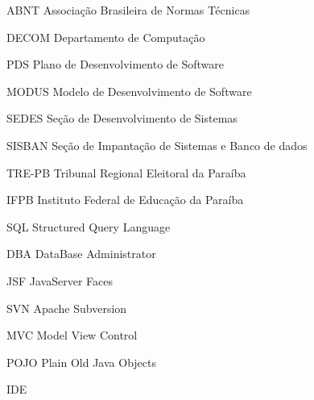 
\begin{siglas}
    \item[ABNT] Associação Brasileira de Normas Técnicas
    \item[DECOM] Departamento de Computação
    \item[PDS] Plano de Desenvolvimento de Software
    \item[MODUS] Modelo de Desenvolvimento de Software
    \item[SEDES] Seção de Desenvolvimento de Sistemas
    \item[SISBAN]Seção de Impantação de Sistemas e Banco de dados
    \item[TRE-PB] Tribunal Regional Eleitoral da Paraíba
    \item[IFPB] Instituto Federal de Educação da Paraíba
    \item[SQL] Structured Query Language
    \item[DBA] DataBase Administrator
    \item[JSF] JavaServer Faces
    \item[SVN] Apache Subversion
    \item[MVC] Model View Control
    \item[POJO] Plain Old Java Objects
    \item[IDE] 
\end{siglas}

